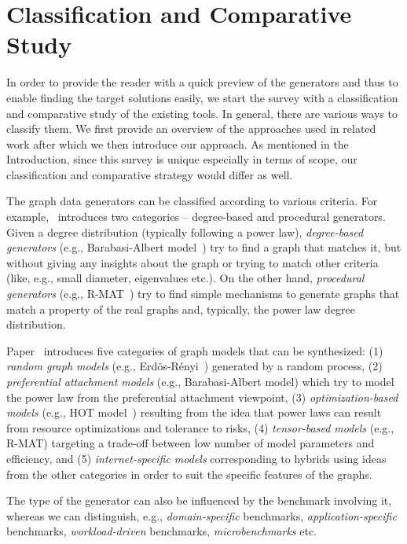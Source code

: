 \section{Classification and Comparative Study}
\label{sec:comparison}

In order to provide the reader with a quick preview of the generators and thus to enable finding the target solutions easily, we start the survey with a  classification and comparative study of the existing tools. In general, there are various ways to classify them. We first provide an overview of the approaches used in related work after which we then introduce our approach. As mentioned in the Introduction, since this survey is unique especially in terms of scope, our classification and comparative strategy would differ as well.

The graph data generators can be classified according to various criteria. For example,~\cite{DBLP:conf/sdm/ChakrabartiZF04} introduces two categories -- degree-based and procedural generators. Given a degree distribution (typically following a power law), \emph{degree-based generators} (e.g., Barabasi-Albert model~\cite{Barabasi99emergenceScaling}) try to find a graph that matches it, but without giving any insights about the graph or trying to match other criteria (like, e.g., small diameter, eigenvalues etc.). On the other hand, \emph{procedural generators} (e.g., R-MAT~\cite{DBLP:conf/sdm/ChakrabartiZF04}) try to find simple mechanisms to generate graphs that match a property of the real graphs and, typically, the power law degree distribution.

Paper~\cite{Chakrabarti:2006:GML:1132952.1132954} introduces five categories of graph models that can be synthesized: (1) \emph{random graph models} (e.g., Erd\"{o}s-R\'{e}nyi~\cite{Erdos:1960}) generated by a random process, (2) \emph{preferential attachment models} (e.g., Barabasi-Albert model) which try to model the power law from the preferential attachment viewpoint, (3) \emph{optimization-based models} (e.g., HOT model~\cite{PhysRevLett.84.2529}) resulting from the idea that power laws can result from resource optimizations and tolerance to risks, (4) \emph{tensor-based models} (e.g., R-MAT) targeting a trade-off between low number of model parameters and efficiency, and (5) \emph{internet-specific models} corresponding to hybrids using ideas from the other categories in order to suit the specific features of the graphs.

The type of the generator can also be influenced by the benchmark involving it, whereas we can distinguish, e.g., \emph{domain-specific} benchmarks, \emph{application-specific} benchmarks, \emph{workload-driven} benchmarks,  \emph{microbenchmarks} etc.


